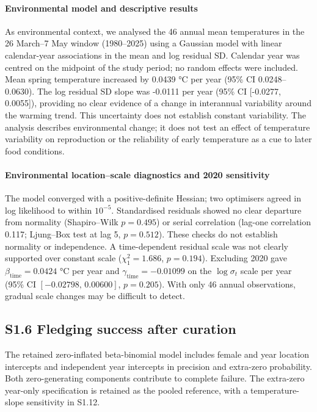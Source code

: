 \documentclass{article}
\begin{document}
\paragraph{Environmental model and descriptive results}

As environmental context, we analysed the 46 annual mean temperatures in the 26 March--7 May window (1980--2025) using a Gaussian model with linear calendar-year associations in the mean and log residual SD. Calendar year was centred on the midpoint of the study period; no random effects were included. Mean spring temperature increased by 0.0439 \si{\degreeCelsius} per year (95\% CI 0.0248--0.0630). The log residual SD slope was -0.0111 per year (95\% CI [-0.0277, 0.0055]), providing no clear evidence of a change in interannual variability around the warming trend. This uncertainty does not establish constant variability. The analysis describes environmental change; it does not test an effect of temperature variability on reproduction or the reliability of early temperature as a cue to later food conditions.

\paragraph{Environmental location--scale diagnostics and 2020 sensitivity}

The model converged with a positive-definite Hessian; two optimisers agreed in log likelihood to within $10^{-5}$. Standardised residuals showed no clear departure from normality (Shapiro--Wilk $p=0.495$) or serial correlation (lag-one correlation 0.117; Ljung--Box test at lag 5, $p=0.512$). These checks do not establish normality or independence. A time-dependent residual scale was not clearly supported over constant scale ($\chi^2_1=1.686$, $p=0.194$). Excluding 2020 gave $\beta_{\mathrm{time}}=0.0424$ \si{\degreeCelsius} per year and $\gamma_{\mathrm{time}}=-0.01099$ on the $\log\sigma_t$ scale per year (95\% CI $[-0.02798,\,0.00600]$, $p=0.205$). With only 46 annual observations, gradual scale changes may be difficult to detect.

\clearpage

\subsection{S1.6 Fledging success after curation}

The retained zero-inflated beta-binomial model includes female and year location intercepts and independent year intercepts in precision and extra-zero probability. Both zero-generating components contribute to complete failure. The extra-zero year-only specification is retained as the pooled reference, with a temperature-slope sensitivity in S1.12.
\end{document}
